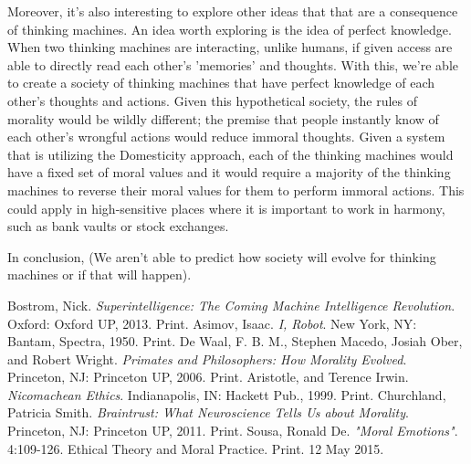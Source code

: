 \documentclass[11pt, oneside]{article}
\begin{document}
\par Moreover, it's also interesting to explore other ideas that that are a consequence of thinking machines. An idea worth exploring is the idea of perfect knowledge. When two thinking machines are interacting, unlike humans, if given access are able to directly read each other's 'memories' and thoughts. With this, we're able to create a society of thinking machines that have perfect knowledge of each other's thoughts and actions.
Given this hypothetical society, the rules of morality would be wildly different; the premise that people instantly know of each other's wrongful actions would reduce immoral thoughts. Given a system that is utilizing the Domesticity approach, each of the thinking machines would have a fixed set of moral values and it would require a majority of the thinking machines to reverse their moral values for them to perform immoral actions. This could apply in high-sensitive places where it is important to work in harmony, such as bank vaults or stock exchanges.
 
\par In conclusion, (We aren't able to predict how society will evolve for thinking machines or if that will happen).

\begin{thebibliography}{9}
  Bostrom, Nick. 
  \emph{Superintelligence: The Coming Machine Intelligence Revolution}.
  Oxford: Oxford UP, 2013.
  Print.
  Asimov, Isaac.
  \emph{I, Robot}.
  New York, NY: Bantam, Spectra, 1950.
  Print.
  De Waal, F. B. M., Stephen Macedo, Josiah Ober, and Robert Wright.
  \emph{Primates and Philosophers: How Morality Evolved}.
  Princeton, NJ: Princeton UP, 2006.
  Print.
  Aristotle, and Terence Irwin.
  \emph{Nicomachean Ethics}.
  Indianapolis, IN: Hackett Pub., 1999.
  Print.
  Churchland, Patricia Smith.
  \emph{Braintrust: What Neuroscience Tells Us about Morality}.
  Princeton, NJ: Princeton UP, 2011. 
  Print.
  Sousa, Ronald De. 
  \emph{"Moral Emotions"}. 
  4:109-126. Ethical Theory and Moral Practice.
  Print. 12 May 2015.
\end{thebibliography}
\end{document}
